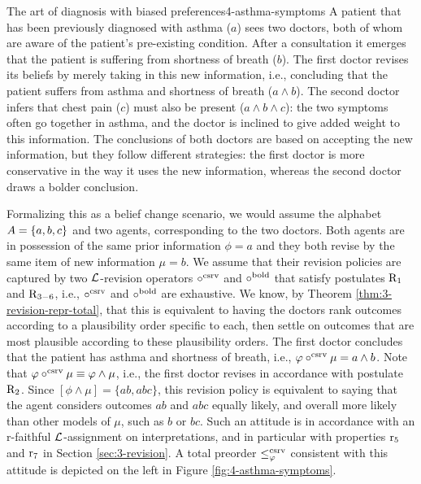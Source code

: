 \begin{xmpl}{The art of diagnosis with biased preferences}{4-asthma-symptoms}
	A patient that has been previously diagnosed with asthma ($a$)
	sees two doctors,
	both of whom are aware of the patient's pre-existing condition.
	After a consultation it emerges that 
	the patient is suffering from shortness of breath ($b$).
	The first doctor revises its beliefs by merely taking in 
	this new information, i.e., concluding
	that the patient suffers from asthma and shortness of breath
	($a\land b$).
	The second doctor infers that chest pain ($c$) 
	must also be present ($a\land b\land c$):
	the two symptoms often go together in asthma, 
	and the doctor is inclined to give added weight 
	to this information.
	The conclusions of both doctors are based on 
	accepting the new information,
	but they follow different strategies: 
	the first doctor is more conservative in the 
	way it uses the new information, 
	whereas the second doctor draws a bolder conclusion.

	Formalizing this as a belief change scenario,
	we would assume
	the alphabet $A=\{a,b,c\}$
	and two agents, corresponding to the two doctors.
	Both agents are in possession of the same 
	prior information $\phi = a$
	and they both revise
	by the same item of new information $\mu=b$.
	We assume that their revision policies 
	are captured by two $\mathcal{L}$-revision operators 
	$\circ^{{\mathrm{csrv}}}$ and $\circ^{{\mathrm{bold}}}$
	that satisfy postulates $\mathrm{R}_{1}$ and $\mathrm{R}_{3-6}$,
	i.e., $\circ^{{\mathrm{csrv}}}$ and $\circ^{{\mathrm{bold}}}$  are exhaustive.
	We know, by Theorem \ref{thm:3-revision-repr-total},
	that this is equivalent to having the doctors
	rank outcomes according to a plausibility order
	specific to each,
	then settle on outcomes
	that are most plausible 
	according to these plausibility orders.
	The first doctor concludes that the patient
	has asthma and shortness of breath,
	i.e., $\varphi\circ^{{\mathrm{csrv}}}\mu =a\land b$.
	Note that $\varphi\circ^{{\mathrm{csrv}}}\mu\equiv\varphi\land\mu$,
	i.e., the first doctor revises in accordance 
	with postulate $\mathrm{R}_{2}$.
	Since $[\phi\land\mu]=\{ab,abc\}$, this 
	revision policy is equivalent to saying that the
	agent considers outcomes $ab$ and $abc$ equally likely,
	and overall more likely than other models of $\mu$,
	such as $b$ or $bc$.
	Such an attitude is in accordance with an r-faithful 
	$\mathcal{L}$-assignment on interpretations,
	and in particular with properties $\mathrm{r}_{5}$ and $\mathrm{r}_{7}$
	in Section \ref{sec:3-revision}.
	A total preorder $\le^{{\mathrm{csrv}}}_{\varphi}$ consistent with this 
	attitude is depicted on the left in Figure \ref{fig:4-asthma-symptoms}.


\end{xmpl}
